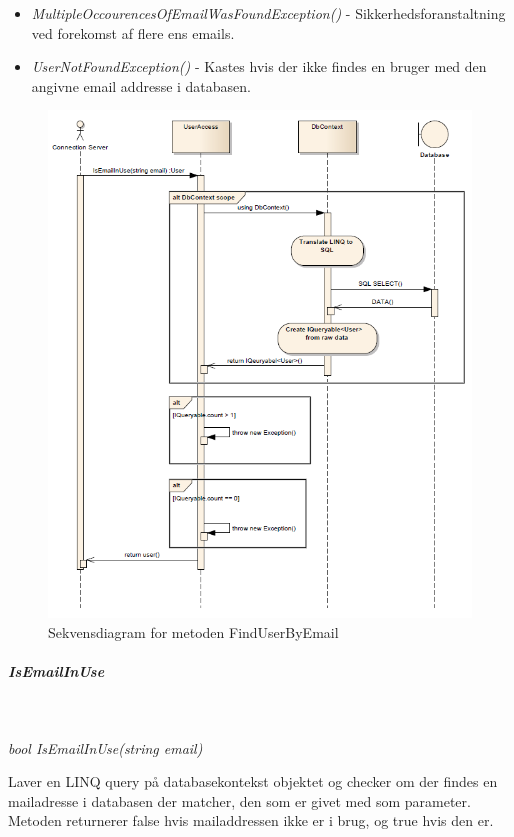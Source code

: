 \begin{itemize}
	\item \textit{MultipleOccourencesOfEmailWasFoundException()} - Sikkerhedsforanstaltning ved forekomst af flere ens emails.
	\item \textit{UserNotFoundException()} - Kastes hvis der ikke findes en bruger med den angivne email addresse i databasen.
\end{itemize}

\begin{figure}[h]
\centering
\includegraphics[width=\linewidth]{figs/dbSeq/findUserByEmail.PNG}
\caption{Sekvensdiagram for metoden FindUserByEmail}
\label{fig:findUserByEmail}
\end{figure}


\subparagraph{IsEmailInUse}\

\textit{bool IsEmailInUse(string email)}

Laver en LINQ query på databasekontekst objektet og checker om der findes en mailadresse i databasen der matcher, den som er givet med som parameter. Metoden returnerer false hvis mailaddressen ikke er i brug, og true hvis den er.

